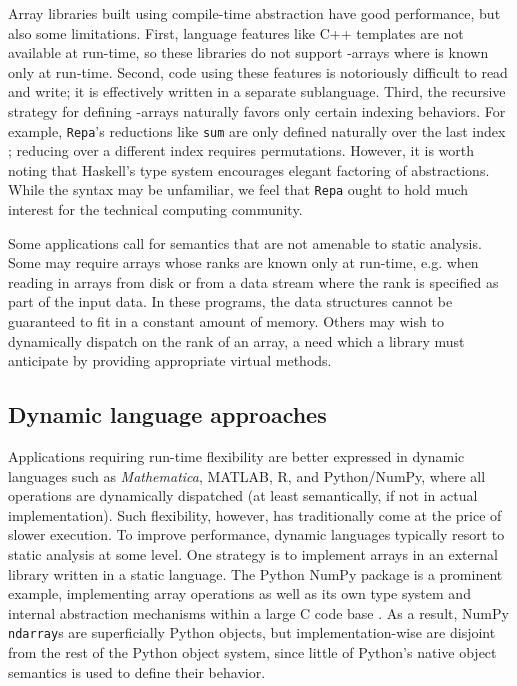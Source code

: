 \documentclass[preprint]{sigplanconf}
\newcommand{\MATLAB}{\textsc{MATLAB}}
\newcommand{\Mathematica}{\textit{Mathematica}}
\newcommand{\code}[1]{\texttt{#1}}
\begin{document}
Array libraries built using compile-time abstraction have good performance,
but also some limitations.
First, language features like C++ templates are not available at run-time, so these
libraries do not support -arrays where  is known only at run-time.
Second, code using these features is
notoriously difficult to read and write; it is effectively written in a
separate sublanguage.
Third, the recursive strategy for defining -arrays
naturally favors only certain indexing behaviors. For example,
\code{Repa}'s reductions like \code{sum} are only defined naturally over the
last index \cite{Keller:2010rs}; reducing over a different index requires
permutations.
However, it is worth noting that Haskell's type system encourages
elegant factoring of abstractions. While the syntax may be unfamiliar,
we feel that \code{Repa} ought to hold much interest for the technical computing
community.


Some applications call for semantics that are not amenable
to static analysis. Some may require arrays whose ranks are known only at
run-time, e.g. when reading in arrays from disk or from a data stream where the
rank is specified as part of the input data. In these programs, the data
structures cannot be
guaranteed to fit in a constant amount of memory. Others may
wish to dynamically dispatch on the rank of an array, a need which a
library must anticipate by providing appropriate virtual methods.



\subsection{Dynamic language approaches}

Applications requiring run-time flexibility are better expressed in
dynamic languages such as \Mathematica, \MATLAB, R, and Python/NumPy, where
all operations are dynamically dispatched (at least semantically, if not
in actual implementation). Such flexibility,
however, has traditionally come at the price of slower execution.
To improve performance, dynamic languages typically resort to static analysis
at some level.
One strategy is to implement arrays in an external library
written in a static language.
The Python NumPy package is a prominent example, implementing array operations
as well as its own type system and internal abstraction mechanisms within
a large C code base \cite{Walt:2011np}. As a result, NumPy \code{ndarray}s are
superficially Python objects, but implementation-wise are disjoint from the
rest of the Python object system, since little of Python's native object
semantics is used to define their behavior.
\end{document}

